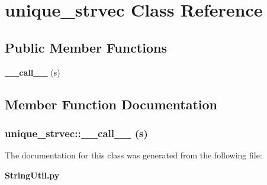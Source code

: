 \section{unique\_\-strvec Class Reference}
\label{classunique__strvec}
\subsection*{Public Member Functions}
\begin{CompactItemize}
\item 
{\bf \_\-\_\-call\_\-\_\-} (s)
\end{CompactItemize}


\subsection{Member Function Documentation}
\subsubsection{\setlength{\rightskip}{0pt plus 5cm}unique\_\-strvec::\_\-\_\-call\_\-\_\- (s)}\label{classunique__strvec_unique__strveca0}




The documentation for this class was generated from the following file:\begin{CompactItemize}
\item 
{\bf String\-Util.py}\end{CompactItemize}
